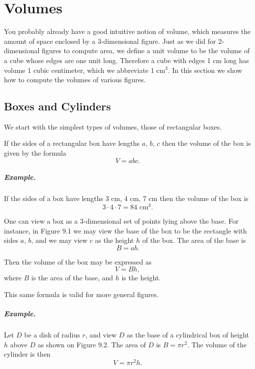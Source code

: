 \documentclass[12pt]{book} %
\begin{document}
\chapter{Volumes}

You probably already have a good intuitive notion of volume, which measures the amount of space enclosed by a 3-dimensional figure. Just as we did for 2-dimensional figures to compute area, we define a unit volume to be the volume of a cube whose edges are one unit long. Therefore a cube with edges 1 cm long has volume 1 cubic centimeter, which we abbreviate 1 cm$^3$. In this section we show how to compute the volumes of various figures.

\section{Boxes and Cylinders}

We start with the simplest types of volumes, those of rectangular boxes.

If the sides of a rectangular box have lengths $a$, $b$, $c$ then the volume of the box is given by the formula
\[
V=abc.
\]


\paragraph{Example.}
If the sides of a box have lengths 3 cm, 4 cm, 7 cm then the volume of the box is
\[
3\cdot 4\cdot 7=84\text{ cm}^3.
\]

One can view a box as a 3-dimensional set of points lying above the base. For instance, in Figure 9.1 we may view the base of the box to be the rectangle with sides $a$, $b$, and we may view $c$ as the height $h$ of the box. The area of the base is
\[
B=ab.
\]

Then the volume of the box may be expressed as
\[
V=Bh,
\]
where $B$ is the area of the base, and $h$ is the height.

This same formula is valid for more general figures.

\paragraph{Example.}
Let $D$ be a disk of radius $r$, and view $D$ as the base of a cylindrical box of height $h$ above $D$ as shown on Figure 9.2. The area of $D$ is $B=\pi r^2$. The volume of the cylinder is then
\[
V=\pi r^2h.
\]
\end{document}
